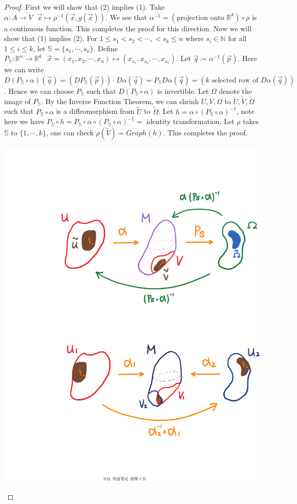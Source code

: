 \documentclass[11pt,oneside]{book}
\theoremstyle{break}
\theoremstyle{break}
\newcommand{\R}{\mathbb{R}}
\newcommand{\N}{\mathbb{N}}
\begin{document}
\begin{proof}
First we will show that (2) implies (1). Take $\alpha: A \to V \ \ \ \vec{x} \mapsto \rho^{-1}(\vec{x},g(\vec{x}))$. We see that $\alpha^{-1} = (\text{projection onto }\R^k)\circ \rho$ is a continuous function. This completes the proof for this direction. Now we will show that (1) implies (2). For $1 \leq s_1 < s_2 <\cdots, < s_k \leq n$ where $s_i \in \N$ for all $1\leq i\leq k$, let $\mathbb{S} = \{s_1,\cdots, s_k\}$. Define $P_\mathbb{S}:\R^n \to \R^k \ \ \ \vec{x}=(x_1,x_2,\cdots,x_n)\mapsto(x_{s_1},x_{s_2},\cdots,x_{s_k})$. Let $\vec{q}\coloneqq \alpha^{-1}(\vec{p})$. Here we can write $D(P_\mathbb{S}\circ \alpha)(\vec{q})= (DP_\mathbb{S}(\vec{p})) \cdot D\alpha(\vec{q}) = P_\mathbb{S}D\alpha(\vec{q}) = (k \text{ selected row of }D\alpha(\vec{q}))$. Hence we can choose $P_\mathbb{S}$ such that $D(P_\mathbb{S}\circ \alpha)$ is invertible. Let $\Omega$ denote the image of $P_\mathbb{S}$. By the Inverse Function Theorem, we can shrink $U,V, \Omega$ to $\widetilde{U},\widetilde{V},\widetilde{\Omega}$ such that $P_\mathbb{S}\circ \alpha$ is a diffeomorphism from $\widetilde{U}$ to $\widetilde{\Omega}$. Let $h = \alpha\circ (P_\mathbb{S}\circ \alpha)^{-1}$, note here we have $P_\mathbb{S}\circ h = P_\mathbb{S}\circ \alpha\circ (P_\mathbb{S}\circ \alpha)^{-1} = $ identity transformation. Let $\rho$ takes $\mathbb{S}$ to $\{1,\cdots, k\}$, one can check $\rho(\widetilde{V}) = Graph(h)$. This completes the proof.
\begin{center}
\includegraphics[scale=0.69]{manifoldsDefn.pdf}

\end{center}
\end{proof}
\end{document}
